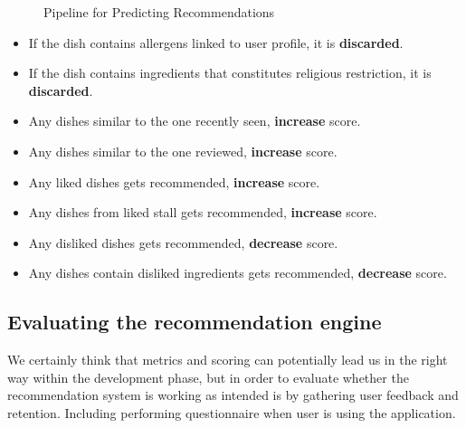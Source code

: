 \begin{figure}[h!]
    \centering
    
    \caption{Pipeline for Predicting Recommendations}
    \label{fig:pipeline-for-predicting-2}
\end{figure}

\begin{itemize}[leftmargin=80pt]
    \item If the dish contains allergens linked to user profile, it is \textbf{discarded}.
    \item If the dish contains ingredients that constitutes religious restriction, it is \textbf{discarded}.
    \item Any dishes similar to the one recently seen, \textbf{increase} score.
    \item Any dishes similar to the one reviewed, \textbf{increase} score.
    \item Any liked dishes gets recommended, \textbf{increase} score.
    \item Any dishes from liked stall gets recommended, \textbf{increase} score.
    \item Any disliked dishes gets recommended, \textbf{decrease} score.
    \item Any dishes contain disliked ingredients gets recommended, \textbf{decrease} score.
\end{itemize}

\subsection{Evaluating the recommendation engine}
We certainly think that metrics and scoring can potentially lead us in
the right way within the development phase, but in order to evaluate
whether the recommendation system is working as intended is by gathering
user feedback and retention. Including performing questionnaire when user
is using the application.